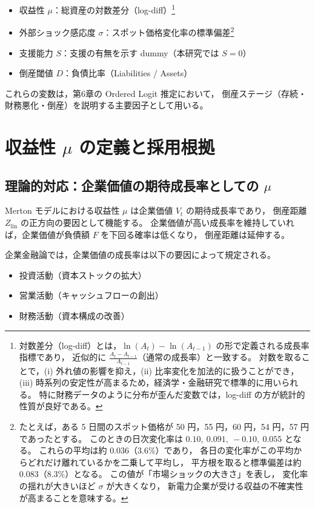\begin{itemize}
    \item 収益性 $\mu$：総資産の対数差分（log-diff）\footnote{
対数差分（log-diff）とは，$\ln(A_t)-\ln(A_{t-1})$ の形で定義される成長率指標であり，
近似的に $\frac{A_t-A_{t-1}}{A_{t-1}}$（通常の成長率）と一致する。
対数を取ることで，(i) 外れ値の影響を抑え，(ii) 比率変化を加法的に扱うことができ，
(iii) 時系列の安定性が高まるため，経済学・金融研究で標準的に用いられる。
特に財務データのように分布が歪んだ変数では，log-diff の方が統計的性質が良好である。
}
    \item 外部ショック感応度 $\sigma$：スポット価格変化率の標準偏差\footnote{
たとえば，ある 5 日間のスポット価格が
50 円，55 円，60 円，54 円，57 円であったとする。
このときの日次変化率は
$0.10,\ 0.091,\ -0.10,\ 0.055$ となる。
これらの平均は約 $0.036$（3.6\%）であり，
各日の変化率がこの平均からどれだけ離れているかを二乗して平均し，
平方根を取ると標準偏差は約 $0.083$（8.3\%）となる。
この値が「市場ショックの大きさ」を表し，
変化率の揺れが大きいほど $\sigma$ が大きくなり，
新電力企業が受ける収益の不確実性が高まることを意味する。
}
    \item 支援能力 $S$：支援の有無を示す dummy（本研究では $S=0$）
    \item 倒産閾値 $D$：負債比率（Liabilities / Assets）
\end{itemize}

これらの変数は，第6章の Ordered Logit 推定において，
倒産ステージ（存続・財務悪化・倒産）を説明する主要因子として用いる。

\section{収益性 $\mu$ の定義と採用根拠}

\subsection{理論的対応：企業価値の期待成長率としての $\mu$}

Merton モデルにおける収益性 $\mu$ は企業価値 $V_t$ の期待成長率であり，
倒産距離 $Z_{\text{lin}}$ の正方向の要因として機能する。
企業価値が高い成長率を維持していれば，企業価値が負債額 $F$ を下回る確率は低くなり，
倒産距離は延伸する。

企業金融論では，企業価値の成長率は以下の要因によって規定される。

\begin{itemize}
    \item 投資活動（資本ストックの拡大）
    \item 営業活動（キャッシュフローの創出）
    \item 財務活動（資本構成の改善）
\end{itemize}

